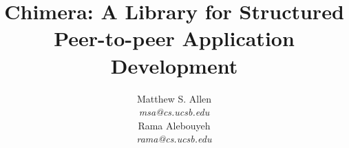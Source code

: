 \documentclass[onecolumn,11pt]{article}
\begin{document}
\title{\bf Chimera: A Library for Structured Peer-to-peer Application Development} 
\author{
  \parbox{2.9in}{\centering Matthew S. Allen\\{\em msa@cs.ucsb.edu}}
  \parbox{2.9in}{\centering Rama Alebouyeh\\{\em rama@cs.ucsb.edu}}
}
\date{}
\maketitle{}









\end{document}
